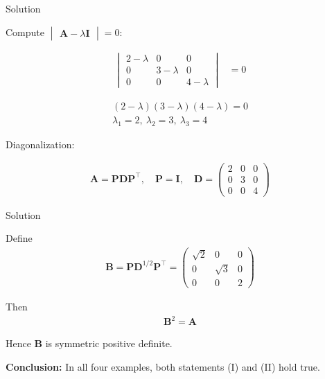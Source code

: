 \documentclass{beamer}
\numberwithin{equation}{section}
\theoremstyle{remark}
\newcommand{\myvec}[1]{\ensuremath{\begin{pmatrix}#1\end{pmatrix}}}
\newcommand{\mydet}[1]{\ensuremath{\begin{vmatrix}#1\end{vmatrix}}}
\let\vec\mathbf
\begin{document}
\begin{frame}{Solution}

Compute $\mydet{\vec{A}-\lambda\vec{I}}=0$:

\begin{align}
\mydet{2-\lambda & 0 & 0\\0 & 3-\lambda & 0\\0 & 0 & 4-\lambda} &= 0
\end{align}

\begin{align}
(2-\lambda)(3-\lambda)(4-\lambda) = 0\\
\lambda_1=2,\ \lambda_2=3,\ \lambda_3=4
\end{align}

Diagonalization:

\begin{align}
\vec{A} = \vec{P}\vec{D}\vec{P}^\top,\quad \vec{P}=\vec{I},\quad
\vec{D}=\myvec{2 & 0 & 0\\0 & 3 & 0\\0 & 0 & 4}
\end{align}

\end{frame}

\begin{frame}{Solution}

Define
\begin{align}
\vec{B} = \vec{P}\vec{D}^{1/2}\vec{P}^\top
= \myvec{\sqrt{2} & 0 & 0\\0 & \sqrt{3} & 0\\0 & 0 & 2}
\end{align}

Then
\begin{align}
\vec{B}^2 = \vec{A}
\end{align}

Hence $\vec{B}$ is symmetric positive definite.

\textbf{Conclusion:}  
In all four examples, both statements (I) and (II) hold true.

\end{frame}
\end{document}
